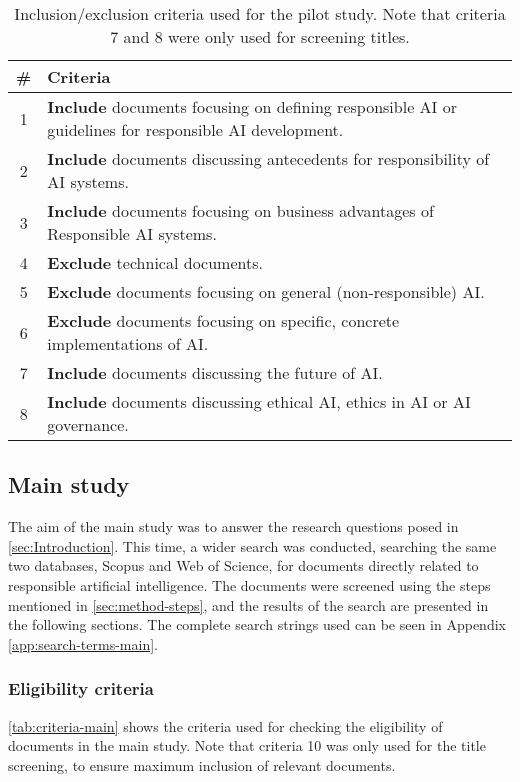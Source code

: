 \begin{table}[htp]
    \centering
    \begin{tabular}{cp{}}
        \textbf{\#} & \textbf{Criteria} \\
        \hline
        1 & \textbf{Include} documents focusing on defining responsible AI or guidelines for responsible AI development. \\
        2 & \textbf{Include} documents discussing antecedents for responsibility of AI systems. \\
        3 & \textbf{Include} documents focusing on business advantages of Responsible AI systems. \\
        \hline
        4 & \textbf{Exclude} technical documents. \\
        5 & \textbf{Exclude} documents focusing on general (non-responsible) AI. \\
        6 & \textbf{Exclude} documents focusing on specific, concrete implementations of AI. \\
        \hline
        7 & \textbf{Include} documents discussing the future of AI. \\
        8 & \textbf{Include} documents discussing ethical AI, ethics in AI or AI governance. \\
    \end{tabular}
    \caption[Inclusion/exclusion criteria used for the pilot study]{Inclusion/exclusion criteria used for the pilot study. Note that criteria 7 and 8 were only used for screening titles.}
    \label{tab:criteria-pilot}
\end{table}


\subsection{Main study}
The aim of the main study was to answer the research questions posed in \autoref{sec:Introduction}. This time, a wider search was conducted, searching the same two databases, Scopus and Web of Science, for documents directly related to responsible artificial intelligence. The documents were screened using the steps mentioned in \autoref{sec:method-steps}, and the results of the search are presented in the following sections. The complete search strings used can be seen in Appendix \ref{app:search-terms-main}.


\subsubsection{Eligibility criteria}
\autoref{tab:criteria-main} shows the criteria used for checking the eligibility of documents in the main study. Note that criteria 10 was only used for the title screening, to ensure maximum inclusion of relevant documents.


